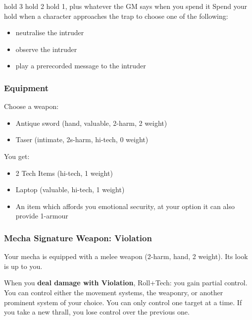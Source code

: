 {hold 3}
{hold 2}
{hold 1, plus whatever the GM says when you spend it}
Spend your hold when a character approaches the trap to choose one of the following:
\begin{itemize}
\item neutralise the intruder
\item observe the intruder
\item play a prerecorded message to the intruder
\end{itemize}


\subsubsection{Equipment}
Choose a weapon:
\begin{itemize}
\item Antique sword (hand, valuable, 2-harm, 2 weight)
\item Taser (intimate, 2s-harm, hi-tech, 0 weight)
\end{itemize}

You get:
\begin{itemize}
\item 2 Tech Items (hi-tech, 1 weight)
\item Laptop (valuable, hi-tech, 1 weight)
\item An item which affords you emotional security, at your option it can also provide 1-armour
\end{itemize}

\subsubsection{Mecha Signature Weapon: Violation}
Your mecha is equipped with a melee weapon (2-harm, hand, 2 weight). Its look is up to you.

When you \textbf{deal damage with Violation}, Roll+Tech:
{you gain partial control. You can control either the movement systems, the weaponry, or another prominent system of your choice.}
You can only control one target at a time. If you take a new thrall, you lose control over the previous one.

